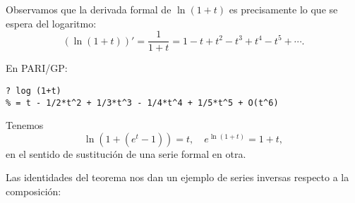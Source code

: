 \documentclass{article}
\begin{document}
Observamos que la derivada formal de $\ln (1+t)$ es precisamente lo que se espera del logaritmo:
$$(\ln (1+t))' = \frac{1}{1+t} = 1 - t + t^2 - t^3 + t^4 - t^5 + \cdots.$$

\begin{shaded}
\noindent\small En PARI/GP:

\begin{verbatim}
? log (1+t)
% = t - 1/2*t^2 + 1/3*t^3 - 1/4*t^4 + 1/5*t^5 + O(t^6)
\end{verbatim}
\end{shaded}

\begin{teorema*}
Tenemos
$$\ln (1 + (e^t - 1)) = t, \quad e^{\ln (1 + t)} = 1 + t,$$
en el sentido de sustitución de una serie formal en otra.
\end{teorema*}


Las identidades del teorema nos dan un ejemplo de series inversas respecto a la composición:
\end{document}
